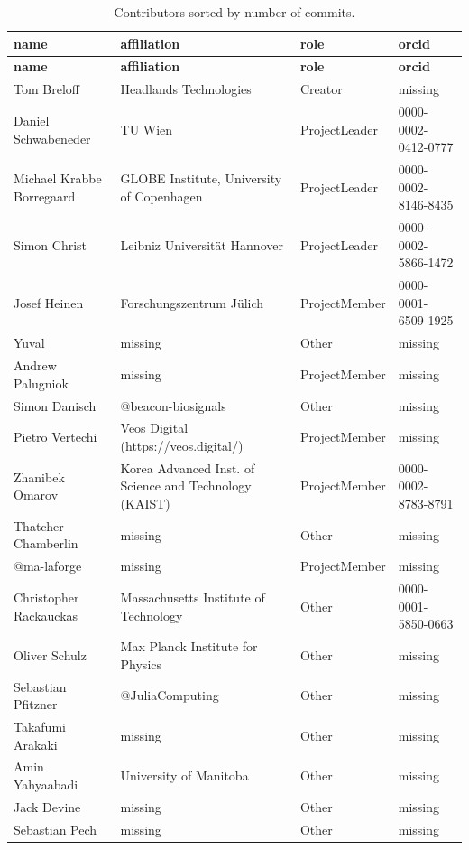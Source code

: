 \newcommand{\Plots}{\texttt{Plots.jl}~}
\newcommand{\RecipesBase}{\texttt{RecipesBase.jl}~}
\begin{longtable}{p{4cm}p{4cm}ll}
    \caption{Contributors sorted by number of commits.}\\
  \hline\hline
  \textbf{name} & \textbf{affiliation} & \textbf{role} & \textbf{orcid} \\\hline
  \endfirsthead
  \hline\hline
  \textbf{name} & \textbf{affiliation} & \textbf{role} & \textbf{orcid} \\\hline
  \endhead
  \hline\hline
  \endfoot
  \endlastfoot
  Tom Breloff & Headlands Technologies & Creator & missing \\
  Daniel Schwabeneder & TU Wien & ProjectLeader & 0000-0002-0412-0777 \\
  Michael Krabbe Borregaard & GLOBE Institute, University of Copenhagen & ProjectLeader & 0000-0002-8146-8435 \\
  Simon Christ & Leibniz Universität Hannover & ProjectLeader & 0000-0002-5866-1472 \\
  Josef Heinen & Forschungszentrum Jülich & ProjectMember & 0000-0001-6509-1925 \\
  Yuval & missing & Other & missing \\
  Andrew Palugniok & missing & ProjectMember & missing \\
  Simon Danisch & @beacon-biosignals & Other & missing \\
  Pietro Vertechi & Veos Digital (https://veos.digital/) & ProjectMember & missing \\
  Zhanibek Omarov & Korea Advanced Inst. of Science and Technology (KAIST) & ProjectMember & 0000-0002-8783-8791 \\
  Thatcher Chamberlin & missing & Other & missing \\
  @ma-laforge & missing & ProjectMember & missing \\
  Christopher Rackauckas & Massachusetts Institute of Technology & Other & 0000-0001-5850-0663 \\
  Oliver Schulz & Max Planck Institute for Physics & Other & missing \\
  Sebastian Pfitzner & @JuliaComputing & Other & missing \\
  Takafumi Arakaki & missing & Other & missing \\
  Amin Yahyaabadi & University of Manitoba & Other & missing \\
  Jack Devine & missing & Other & missing \\
  Sebastian Pech & missing & Other & missing \\

\end{longtable}
